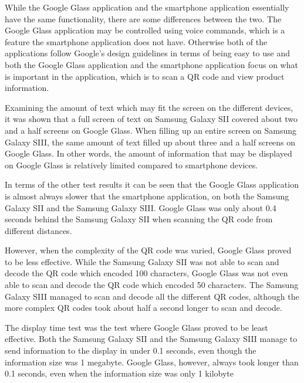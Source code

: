While the Google Glass application and the smartphone application essentially have the same functionality, there are some differences between the two. The Google Glass application may be controlled using voice commands, which is a feature the smartphone application does not have. Otherwise both of the applications follow Google's design guidelines in terms of being easy to use and both the Google Glass application and the smartphone application focus on what is important in the application, which is to scan a QR code and view product information.

Examining the amount of text which may fit the screen on the different devices, it was shown that a full screen of text on Samsung Galaxy SII covered about two and a half screens on Google Glass. When filling up an entire screen on Samsung Galaxy SIII, the same amount of text filled up about three and a half screens on Google Glass. In other words, the amount of information that may be displayed on Google Glass is relatively limited compared to smartphone devices.

In terms of the other test results it can be seen that the Google Glass application is almost always slower that the smartphone application, on both the Samsung Galaxy SII and the Samsung Galaxy SIII. Google Glass was only about 0.4 seconds behind the Samsung Galaxy SII when scanning the QR code from different distances.

However, when the complexity of the QR code was varied, Google Glass proved to be less effective. While the Samsung Galaxy SII was not able to scan and decode the QR code which encoded 100 characters, Google Glass was not even able to scan and decode the QR code which encoded 50 characters. The Samsung Galaxy SIII managed to scan and decode all the different QR codes, although the more complex QR codes took about half a second longer to scan and decode.

The display time test was the test where Google Glass proved to be least effective. Both the Samsung Galaxy SII and the Samsung Galaxy SIII manage to send information to the display in under 0.1 seconds, even though the information size was 1 megabyte. Google Glass, however, always took longer than 0.1 seconds, even when the information size was only 1 kilobyte